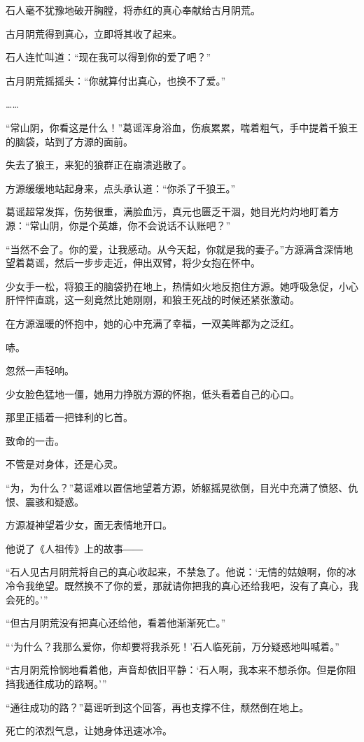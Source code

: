 \begin{this_body}
石人毫不犹豫地破开胸膛，将赤红的真心奉献给古月阴荒。

古月阴荒得到真心，立即将其收了起来。

石人连忙叫道：“现在我可以得到你的爱了吧？”

古月阴荒摇摇头：“你就算付出真心，也换不了爱。”

……

“常山阴，你看这是什么！”葛谣浑身浴血，伤痕累累，喘着粗气，手中提着千狼王的脑袋，站到了方源的面前。

失去了狼王，来犯的狼群正在崩溃逃散了。

方源缓缓地站起身来，点头承认道：“你杀了千狼王。”

葛谣超常发挥，伤势很重，满脸血污，真元也匮乏干涸，她目光灼灼地盯着方源：“常山阴，你是个英雄，你不会说话不认账吧？”

“当然不会了。你的爱，让我感动。从今天起，你就是我的妻子。”方源满含深情地望着葛谣，然后一步步走近，伸出双臂，将少女抱在怀中。

少女手一松，将狼王的脑袋扔在地上，热情如火地反抱住方源。她呼吸急促，小心肝怦怦直跳，这一刻竟然比她刚刚，和狼王死战的时候还紧张激动。

在方源温暖的怀抱中，她的心中充满了幸福，一双美眸都为之泛红。

哧。

忽然一声轻响。

少女脸色猛地一僵，她用力挣脱方源的怀抱，低头看着自己的心口。

那里正插着一把锋利的匕首。

致命的一击。

不管是对身体，还是心灵。

“为，为什么？”葛谣难以置信地望着方源，娇躯摇晃欲倒，目光中充满了愤怒、仇恨、震骇和疑惑。

方源凝神望着少女，面无表情地开口。

他说了《人祖传》上的故事――

“石人见古月阴荒将自己的真心收起来，不禁急了。他说：‘无情的姑娘啊，你的冰冷令我绝望。既然换不了你的爱，那就请你把我的真心还给我吧，没有了真心，我会死的。’”

“但古月阴荒没有把真心还给他，看着他渐渐死亡。”

“‘为什么？我那么爱你，你却要将我杀死！’石人临死前，万分疑惑地叫喊着。”

“古月阴荒怜悯地看着他，声音却依旧平静：‘石人啊，我本来不想杀你。但是你阻挡我通往成功的路啊。’”

“通往成功的路？”葛谣听到这个回答，再也支撑不住，颓然倒在地上。

死亡的浓烈气息，让她身体迅速冰冷。


\end{this_body}
